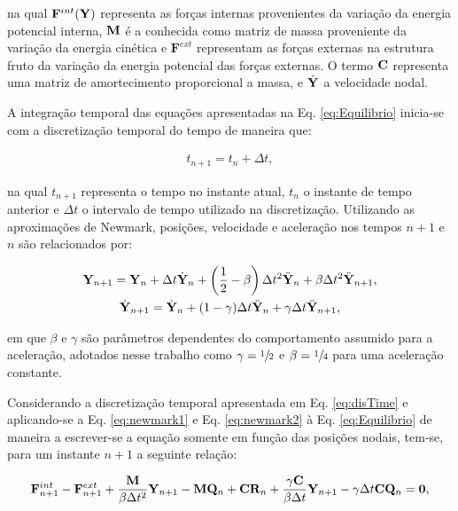 \documentclass[tese_patricia]{subfiles}
\begin{document}
\noindent na qual $ \mathbf{F}^{int}(\mathbf{Y})$ representa as forças internas provenientes da variação da energia potencial interna, $\mathbf{M}$ é a conhecida como matriz de massa proveniente da variação da energia cinética e $\mathbf{F}^{ext}$ representam as forças externas na estrutura fruto da variação da energia potencial das forças externas. O termo $\mathbf{C}$ representa uma matriz de amortecimento proporcional a massa, e $\dot{\mathbf{Y}}_{}$ a velocidade nodal.

A integração temporal das equações apresentadas na Eq. \eqref{eq:Equilibrio} inicia-se com a discretização temporal do tempo de maneira que:

\begin{align}
t_{n+1} = t_{n} + \Delta t, \label{eq:disTime}
\end{align}

\noindent na qual $t_{n+1}$ representa o tempo no instante atual, $t_{n}$ o instante de tempo anterior e  $\Delta t$ o intervalo de tempo utilizado na discretização. Utilizando as aproximações de Newmark, posições, velocidade e aceleração nos tempos $n+1$ e $n$ são relacionados por:

\begin{gather}
\mathbf{Y}_{n+1}=\mathbf{Y}_{n} + \Delta t \dot{\mathbf{Y}}_{n}+\left(\frac{1}{2}-\beta\right) \Delta t^2 \ddot{\mathbf{Y}}_{n}+ \beta \Delta t^2 \ddot{\mathbf{Y}}_{n+1},\label{eq:newmark1}\\
\dot{\mathbf{Y}}_{n+1} = \dot{\mathbf{Y}}_{n}+(1-\gamma)\Delta t \ddot{\mathbf{Y}}_{n}+\gamma \Delta t \ddot{\mathbf{Y}}_{n+1},\label{eq:newmark2}
\end{gather}

\noindent em que $\beta$ e $\gamma$ são parâmetros dependentes do comportamento assumido para a aceleração, adotados nesse trabalho como $\gamma=\sfrac{1}{2}$ e $\beta=\sfrac{1}{4}$ para uma aceleração constante.

Considerando a discretização temporal apresentada em Eq. \eqref{eq:disTime} e aplicando-se a Eq. \eqref{eq:newmark1} e Eq. \eqref{eq:newmark2} à Eq. \eqref{eq:Equilibrio} de maneira a escrever-se a equação somente em função das posições nodais, tem-se, para um instante $n+1$ a seguinte relação:

\begin{gather}
\mathbf{F}^{int}_{n+1}- \mathbf{F}^{ext}_{n+1} + \frac{\mathbf{M}}{\beta \Delta t^2} \mathbf{Y}_{n+1}-\mathbf{M} \mathbf{Q}_n+ \mathbf{C}\mathbf{R}_n + \frac{\gamma \mathbf{C}}{\beta \Delta t}\mathbf{Y}_{n+1} - \gamma\Delta t \mathbf{C}\mathbf{Q}_n = \mathbf{0},
\label{eq:equilibrio_newmark}
\end{gather}
\end{document}
